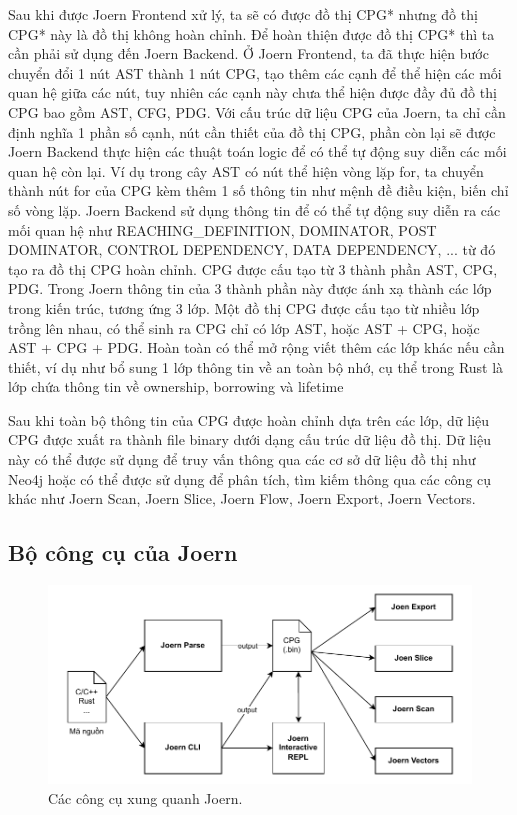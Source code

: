 Sau khi được Joern Frontend xử lý, ta sẽ có được đồ thị CPG* nhưng đồ thị CPG* này là đồ thị không hoàn chỉnh. Để hoàn thiện được đồ thị CPG* thì ta cần phải sử dụng đến Joern Backend. Ở Joern Frontend, ta đã thực hiện bước chuyển đổi 1 nút AST thành 1 nút CPG, tạo thêm các cạnh để thể hiện các mối quan hệ giữa các nút, tuy nhiên các cạnh này chưa thể hiện được đầy đủ đồ thị CPG bao gồm AST, CFG, PDG. Với cấu trúc dữ liệu CPG của Joern, ta chỉ cần định nghĩa 1 phần số cạnh, nút cần thiết của đồ thị CPG, phần còn lại sẽ được Joern Backend thực hiện các thuật toán logic để có thể tự động suy diễn các mối quan hệ còn lại. Ví dụ trong cây AST có nút thể hiện vòng lặp for, ta chuyển thành nút for của CPG kèm thêm 1 số thông tin như mệnh đề điều kiện, biến chỉ số vòng lặp. Joern Backend sử dụng thông tin để có thể tự động suy diễn ra các mối quan hệ như REACHING\_DEFINITION, DOMINATOR, POST DOMINATOR, CONTROL DEPENDENCY, DATA DEPENDENCY, ... từ đó tạo ra đồ thị CPG hoàn chỉnh. CPG được cấu tạo từ 3 thành phần AST, CPG, PDG. Trong Joern thông tin của 3 thành phần này được ánh xạ thành các lớp trong kiến trúc, tương ứng 3 lớp. Một đồ thị CPG được cấu tạo từ nhiều lớp trồng lên nhau, có thể sinh ra CPG chỉ có lớp AST, hoặc AST + CPG, hoặc AST + CPG + PDG. Hoàn toàn có thể mở rộng viết thêm các lớp khác nếu cần thiết, ví dụ như bổ sung 1 lớp thông tin về an toàn bộ nhớ, cụ thể trong Rust là lớp chứa thông tin về ownership, borrowing và lifetime

Sau khi toàn bộ thông tin của CPG được hoàn chỉnh dựa trên các lớp, dữ liệu CPG được xuất ra thành file binary dưới dạng cấu trúc dữ liệu đồ thị. Dữ liệu này có thể được sử dụng để truy vấn thông qua các cơ sở dữ liệu đồ thị như Neo4j \cite{miller2013graph} hoặc có thể được sử dụng để phân tích, tìm kiếm thông qua các công cụ khác như Joern Scan, Joern Slice, Joern Flow, Joern Export, Joern Vectors.

\subsection{Bộ công cụ của Joern}

\begin{figure}[H]
  \includegraphics[width=1\columnwidth]{figures/c2/c2_joern_tools.drawio.pdf}
  \centering
  \caption{Các công cụ xung quanh Joern.}
  \label{img:c2_joern_tools}
\end{figure}

